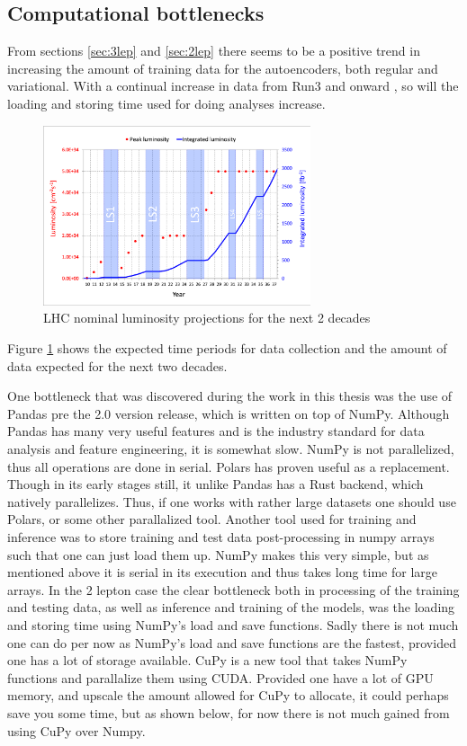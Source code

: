 \subsection*{Computational bottlenecks}
From sections \ref{sec:3lep} and \ref{sec:2lep} there seems to be a positive trend in increasing the amount 
of training data for the autoencoders, both regular and variational. With a continual increase in data from 
Run3 and onward \cite{LHC_int_lum}, so will the loading and storing time used for doing analyses increase. 

\begin{figure}[H]
    \caption[LHC nominal luminosity projections]{LHC nominal luminosity projections for the next 2 decades}
    \label{fig:lhc_nom}
    \centering
    \includegraphics[width=0.7\textwidth]{Figures/atlas/LHC-nominal-lumi-projection.png}
\end{figure}
Figure \ref{fig:lhc_nom} shows the expected time periods for data collection and the amount of data expected for 
the next two decades. \par
One bottleneck that was discovered during the work in this thesis was the use of Pandas pre the 2.0 version release, which is 
written on top of NumPy. Although Pandas has many very useful features and is the industry standard for 
data analysis and feature engineering, it is somewhat slow. NumPy is not parallelized, thus all operations are 
done in serial. Polars has proven useful as a replacement. Though in its early stages still, it unlike Pandas 
has a Rust backend, which natively parallelizes. Thus, if one works with rather large datasets one should use
Polars, or some other parallalized tool. Another tool used for training and inference was to store training 
and test data post-processing in numpy arrays such that one can just load them up. NumPy makes this very simple, 
but as mentioned above it is serial in its execution and thus takes long time for large arrays. In the 2 lepton 
case the clear bottleneck both in processing of the training and testing data, as well as inference and training 
of the models, was the loading and storing time using NumPy's load and save functions. Sadly there is not much 
one can do per now as NumPy's load and save functions are the fastest, provided one has a lot of storage available. 
CuPy\cite{cupy_learningsys2017} is a new tool that takes NumPy functions and parallalize them using CUDA. Provided 
one have a lot of GPU memory, and upscale the amount allowed for CuPy to allocate, it could perhaps save you some time, 
but as shown below, for now there is not much gained from using CuPy over Numpy. 

